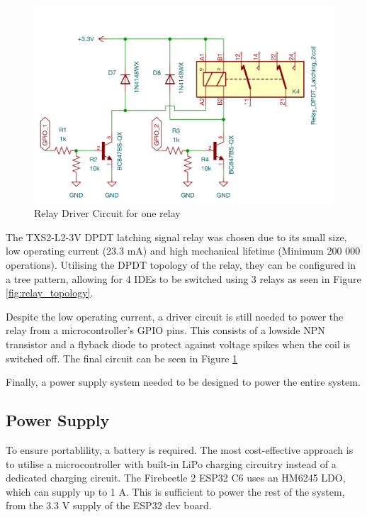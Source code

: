 \begin{figure}[H]
\begin{minipage}{0.6\textwidth}
        \centering
        \includegraphics[width=\textwidth]{RelayDriverSchem.png}
        \caption{Relay Driver Circuit for one relay}
        \label{fig:relay_circuit}
    \end{minipage}
\end{figure}
The TXS2-L2-3V DPDT latching signal relay was chosen due to its small size, low operating current (23.3 mA) and high mechanical lifetime (Minimum 200 000 operations). Utilising the DPDT topology of the relay, they can be configured in a tree pattern, allowing for 4 \acp{IDE} to be switched using 3 relays as seen in Figure \ref{fig:relay_topology}. 

Despite the low operating current, a driver circuit is still needed to power the relay from a microcontroller's \ac{GPIO} pins. This consists of a lowside NPN transistor and a flyback diode to protect against voltage spikes when the coil is switched off. The final circuit can be seen in Figure \ref{fig:relay_circuit}

Finally, a power supply system needed to be designed to power the entire system.
\subsection{Power Supply}
To ensure portablility, a battery is required. The most cost-effective approach is to utilise a microcontroller with built-in LiPo charging circuitry instead of a dedicated charging circuit. The Firebeetle 2 ESP32 C6 uses an HM6245 \ac{LDO}, which can supply up to 1 A. This is sufficient to power the rest of the system, from the 3.3 V supply of the ESP32 dev board.



